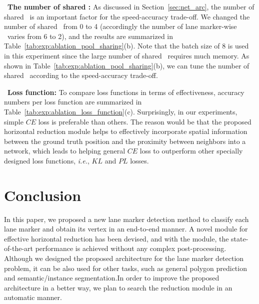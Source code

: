 \documentclass[10pt,twocolumn,letterpaper]{article}
\begin{document}
\ \textbf{The number of shared \reductionname:} As discussed in Section~\ref{sec:net_arc}, the number of shared \reductionnames\ is an important factor for the speed-accuracy trade-off. We changed the number of shared \reductionnames\ from 0 to 4 (accordingly the number of lane marker-wise \reductionnames\ varies from 6 to 2), and the results are summarized in Table~\ref{tab:exp:ablation_pool_sharing}(b). Note that the batch size of 8 is used in this experiment since the large number of shared \reductionnames\ requires much memory. As shown in Table~\ref{tab:exp:ablation_pool_sharing}(b), we can tune the number of shared \reductionname\ according to the speed-accuracy trade-off.

\ \textbf{Loss function:} To compare loss functions in terms of effectiveness, accuracy numbers per loss function are summarized in Table~\ref{tab:exp:ablation_loss_function}(c). Surprisingly, in our experiments, simple $CE$ loss is preferable than others. The reason would be that the proposed horizontal reduction module helps to effectively incorporate spatial information between the ground truth position and the proximity between neighbors into a network, which leads to helping general $CE$ loss to outperform other specially designed loss functions, \textit{i.e.}, $KL$ and $PL$ losses.

\section{Conclusion} 
In this paper, we proposed a new lane marker detection method to classify each lane marker and obtain its vertex in an end-to-end manner. A novel module for effective horizontal reduction has been devised, and with the module, the state-of-the-art performance is achieved without any complex post-processing. Although we designed the proposed architecture for the lane marker detection problem, it can be also used for other tasks, such as general polygon prediction and semantic/instance segmentation.In order to improve the proposed architecture in a better way, we plan to search the reduction module in an automatic manner.

{\small


}
\end{document}
